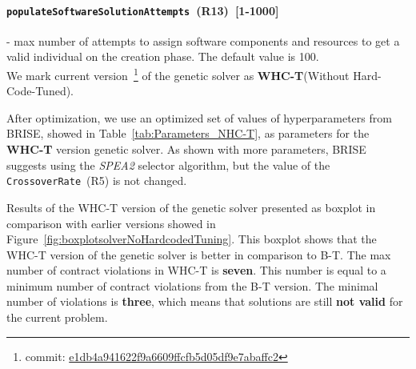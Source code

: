 \paragraph{\texttt{populateSoftwareSolutionAttempts}~(R13)~[1-1000]} -  max number of attempts to assign software components and resources to get a valid individual on the creation phase. The default value is 100.\\

We mark current version~\footnote{commit: \href{https://git-st.inf.tu-dresden.de/mquat/mquat2/commit/e1db4a941622f9a6609ffcfb5d05df9e7abaffc2}{e1db4a941622f9a6609ffcfb5d05df9e7abaffc2}} of the genetic solver as \textbf{WHC-T}(Without Hard-Code-Tuned).

After optimization, we use an optimized set of values of hyperparameters from BRISE, showed in Table~\ref{tab:Parameters_NHC-T}, as parameters for the \textbf{WHC-T} version genetic solver. As shown with more parameters, BRISE suggests using the \textit{SPEA2} selector algorithm, but the value of the \texttt{CrossoverRate}~(R5) is not changed.

\begin{table}
	\centering
	\caption{Parameters of WHC-T version of the genetic solver}\label{tab:Parameters_NHC-T}
\end{table}

Results of the WHC-T version of the genetic solver presented as boxplot in comparison with earlier versions showed in Figure~\ref{fig:boxplotsolverNoHardcodedTuning}. This boxplot shows that the WHC-T version of the genetic solver is better in comparison to B-T. The max number of contract violations in WHC-T is \textbf{seven}. This number is equal to a minimum number of contract violations from the B-T version. The minimal number of violations is \textbf{three}, which means that solutions are still \textbf{not valid} for the current problem. 


